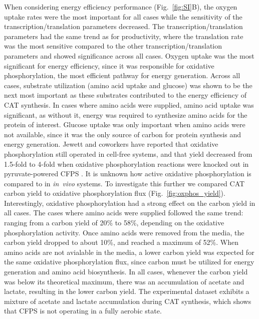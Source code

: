 \documentclass[journal=asbcd6,manuscript=article]{achemso}
\begin{document}
When considering energy efficiency performance (Fig.~\ref{fig:SI}B), the oxygen uptake rates were the most important for all cases while the sensitivity of the transcription/translation parameters decreased.
The transcription/translation parameters had the same trend as for productivity, where the translation rate was the most sensitive compared to the other transcription/translation parameters and showed significance across all cases.
Oxygen uptake was the most significant for energy efficiency, since it was responsible for oxidative phosphorylation, the most efficient pathway for energy generation.
Across all cases, substrate utilization (amino acid uptake and glucose) was shown to be the next most important as these substrates contributed to the energy efficiency of CAT synthesis.
In cases where amino acids were supplied, amino acid uptake was significant, as without it, energy was required to synthesize amino acids for the protein of interest.
Glucose uptake was only important when amino acids were not available, since it was the only source of carbon for protein synthesis and energy generation.
Jewett and coworkers have reported that oxidative phosphorylation still operated in cell-free systems, and that yield decreased from 1.5-fold to 4-fold when oxidative phosphorylation reactions were knocked out in pyruvate-powered CFPS \cite{Jewett:2008aa}.
It is unknown how active oxidative phosphorylation is compared to in \textit{in~vivo} systems.
To investigate this further we compared CAT carbon yield to oxidative phosphorylation flux (Fig.~\ref{fig:oxphos_yield}).
Interestingly, oxidative phosphorylation had a strong effect on the carbon yield in all cases.
The cases where amino acids were supplied followed the same trend: ranging from a carbon yield of 20\% to 58\%, depending on the oxidative phosphorylation activity.
Once amino acids were removed from the media, the carbon yield dropped to about 10\%, and reached a maximum of 52\%.
When amino acids are not avialable in the media, a lower carbon yield was expected for the same oxidative phosphorylation flux, since carbon must be utilized for energy generation and amino acid biosynthesis.
In all cases, whenever the carbon yield was below its theoretical maximum, there was an accumulation of acetate and lactate, resulting in the lower carbon yield.
The experimental dataset exhibits a mixture of acetate and lactate accumulation during CAT synthesis, which shows that CFPS is not operating in a fully aerobic state.
\end{document}
